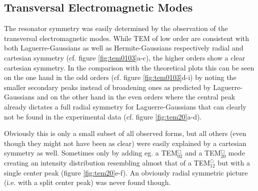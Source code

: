 \documentclass[a4paper]{scrartcl}
\numberwithin{equation}{section}
\numberwithin{figure}{section}
\numberwithin{table}{section}
\begin{document}
\subsection{Transversal Electromagnetic Modes}
The resonator symmetry was easily determined by the observation of the transversal electromagnetic modes. While TEM of low order are consistent with both Laguerre-Gaussians as well as Hermite-Gaussians respectively radial and cartesian symmetry (cf. figure \ref{fig:tem0103}a-c), the higher orders show a clear cartesian symmetry. In the comparison with the theoretical plots this can be seen on the one hand in the odd orders (cf. figure \ref{fig:tem0103}d-i) by noting the smaller secondary peaks instead of broadening ones as predicted by Laguerre-Gaussians and on the other hand in the even orders where the central peak already dictates a full radial symmetry for Laguerre-Gaussians that can clearly not be found in the experimental data (cf. figure \ref{fig:tem20}a-d).

Obviously this is only a small subset of all observed forms, but all others (even though they might not have been as clear) were easily explained by a cartesian symmetry as well. Sometimes only by adding eg. a TEM$^\Box_{02}$ and a TEM$^\Box_{20}$ mode creating an intensity distribution resembling almost that of a TEM$^\bigcirc_{12}$ but with a single center peak (figure \ref{fig:tem20}e-f). An obviously radial symmetric picture (i.e. with a split center peak) was never found though.
\end{document}
